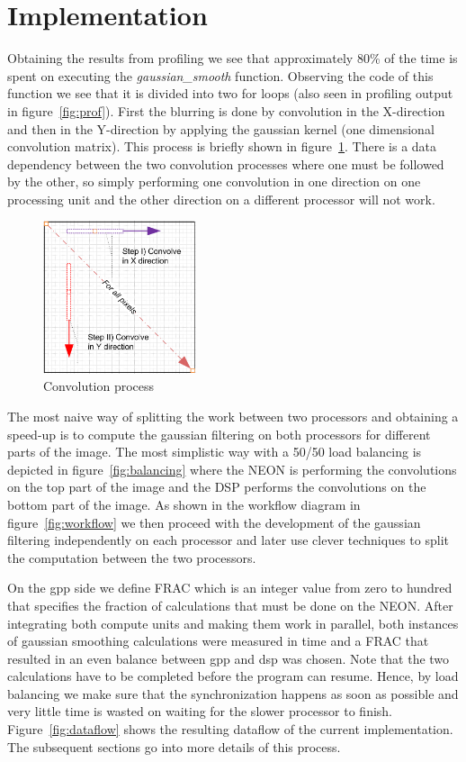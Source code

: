 \section{Implementation}
Obtaining the results from profiling we see that approximately 80\% of the time is spent on executing the \textit{gaussian\_smooth} function. Observing the code of this function we see that it is divided into two for loops (also seen in profiling output in figure~\ref{fig:prof}).
First the blurring is done by convolution in the X-direction and then in the Y-direction by applying the gaussian kernel (one dimensional convolution matrix). This process is briefly shown in figure~\ref{fig:convolution}. There is a data dependency between the two convolution processes where one must be followed by the other, so simply performing one convolution in one direction on one processing unit and the other direction on a different processor will not work.

\begin{figure}
\centering
\includegraphics[width=0.4\textwidth]{drawings/gaussian_general}
\caption{Convolution process}
\label{fig:convolution}
\end{figure}

The most naive way of splitting the work between two processors and obtaining a speed-up is to compute the gaussian filtering on both processors for different parts of the image. The most simplistic way with a 50/50 load balancing is depicted in figure~\ref{fig:balancing} where the NEON is performing the convolutions on the top part of the image and the DSP performs the convolutions on the bottom part of the image. As shown in the workflow diagram in figure~\ref{fig:workflow} we then proceed with the development of the gaussian filtering independently on each processor and later use clever techniques to split the computation between the two processors.

On the gpp side we define FRAC which is an integer value from zero to hundred that specifies the fraction of calculations that must be done on the NEON. After integrating both compute units and making them work in parallel, both instances of gaussian smoothing calculations were measured in time and a FRAC that resulted in an even balance between gpp and dsp was chosen. Note that the two calculations have to be completed before the program can resume.
Hence, by load balancing we make sure that the synchronization happens as soon as possible and very little time is wasted on waiting for the slower processor to finish. Figure~\ref{fig:dataflow} shows the resulting dataflow of the current implementation. The subsequent sections go into more details of this process.

